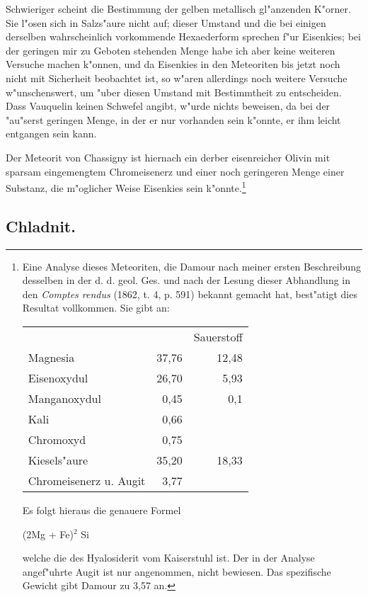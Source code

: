 \documentclass[a4paper, 11pt, oneside]{article}
\begin{document}
Schwieriger scheint die Bestimmung der gelben metallisch gl"anzenden K"orner. Sie l"osen sich in Salzs"aure nicht auf; dieser Umstand und die bei einigen derselben wahrscheinlich vorkommende Hexaederform sprechen f"ur Eisenkies; bei der geringen mir zu Geboten stehenden Menge habe ich aber keine weiteren Versuche machen k"onnen, und da Eisenkies in den Meteoriten bis jetzt noch nicht mit Sicherheit beobachtet ist, so w"aren allerdings noch weitere Versuche w"unschenswert, um "uber diesen Umstand mit Bestimmtheit zu entscheiden. Dass Vauquelin keinen Schwefel angibt, w"urde nichts beweisen, da bei der "au"serst geringen Menge, in der er nur vorhanden sein k"onnte, er ihm leicht entgangen sein kann.

Der Meteorit von Chassigny ist hiernach ein derber eisenreicher Olivin mit sparsam eingemengtem Chromeisenerz und einer noch geringeren Menge einer Substanz, die m"oglicher Weise Eisenkies sein k"onnte.\footnote{Eine Analyse dieses Meteoriten, die Damour nach meiner ersten Beschreibung desselben in der d. d. geol. Ges. und nach der Lesung dieser Abhandlung in den \emph{Comptes rendus} (1862, t. 4, p. 591) bekannt gemacht hat, best"atigt dies Resultat vollkommen. Sie gibt an:
\begin{center}
\begin{tabular}{ l r r }
     & & Sauerstoff\\
    Magnesia & 37,76 & 12,48\\
    Eisenoxydul & 26,70 & 5,93\\
    Manganoxydul & 0,45 & 0,1\\
    Kali & 0,66 & \\
    Chromoxyd & 0,75 & \\
    Kiesels"aure & 35,20 & 18,33\\
    Chromeisenerz u. Augit & 3,77 & \\
\end{tabular}
\end{center}
Es folgt hieraus die genauere Formel
\begin{center}
(2Mg + Fe)$^{2}$ Si
\end{center}
welche die des Hyalosiderit vom Kaiserstuhl ist. Der in der Analyse angef"uhrte Augit ist nur angenommen, nicht bewiesen. Das spezifische Gewicht gibt Damour zu 3,57 an.}
\subsection{Chladnit.}
\end{document}
